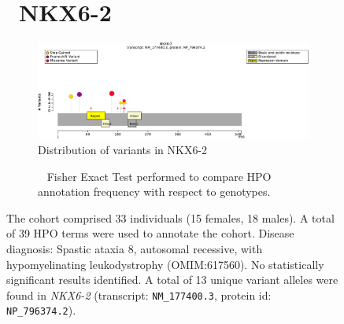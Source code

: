 \begin{figure}[htbp]
\section*{ NKX6-2}
\centering
\begin{subfigure}[b]{0.95\textwidth}
\centering
\includegraphics[width=\textwidth]{ img/NKX6-2_protein_diagram.pdf} 
\captionsetup{justification=raggedright,singlelinecheck=false}
\caption{Distribution of variants in NKX6-2}
\end{subfigure}

\vspace{2em}

\begin{subfigure}[b]{0.95\textwidth}
\centering
{}
\captionsetup{justification=raggedright,singlelinecheck=false}
\caption{             Fisher Exact Test performed to compare HPO annotation frequency with respect to genotypes. }
\end{subfigure}

\vspace{2em}

\caption{ The cohort comprised 33 individuals (15 females, 18 males). A total of 39 HPO terms were used to annotate the cohort. Disease diagnosis: Spastic ataxia 8, autosomal recessive, with hypomyelinating leukodystrophy (OMIM:617560). No statistically significant results identified. A total of 13 unique variant alleles were found in \textit{NKX6-2} (transcript: \texttt{NM\_177400.3}, protein id: \texttt{NP\_796374.2}).}
\end{figure}
